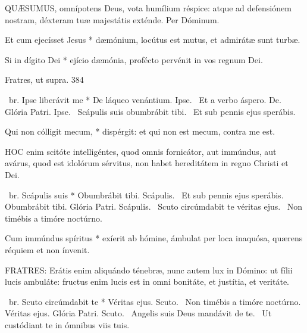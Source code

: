 
\lettrine[lines=2]{Q}{UÆSUMUS}, omnípotens Deus, vota humílium réspice: atque ad defensiónem nostram, déxteram tuæ majestátis exténde. Per Dóminum.


 Et cum ejecísset Jesus * dæmónium, locútus est mutus, et admirátæ sunt turbæ.


 Si in dígito Dei * ejício dæmónia, profécto pervénit in vos regnum Dei.

 Fratres, ut supra. 384

\R\ br. Ipse liberávit me * De láqueo venántium. Ipse. \V\ Et a verbo áspero. De. Glória Patri. Ipse. \V\ Scápulis suis obumbrábit tibi. \R\ Et sub pennis ejus sperábis.


 Qui non cólligit mecum, * dispérgit: et qui non est mecum, contra me est.


\lettrine[lines=2]{H}{OC} enim scitóte intelligéntes, quod omnis fornicátor, aut immúndus, aut avárus, quod est idolórum sérvitus, non habet hereditátem in regno Christi et Dei.

\R\ br. Scápulis suis * Obumbrábit tibi. Scápulis. \V\ Et sub pennis ejus sperábis. Obumbrábit tibi. Glória Patri. Scápulis. \V\ Scuto circúmdabit te véritas ejus. \R\ Non timébis a timóre noctúrno.


 Cum immúndus spíritus * exíerit ab hómine, ámbulat per loca inaquósa, quærens réquiem et non ínvenit.


\lettrine[lines=2]{F}{RATRES}: Erátis enim aliquándo ténebræ, nunc autem lux in Dómino: ut fílii lucis ambuláte: fructus enim lucis est in omni bonitáte, et justítia, et veritáte.

\R\ br. Scuto circúmdabit te * Véritas ejus. Scuto. \V\ Non timébis a timóre noctúrno. Véritas ejus. Glória Patri. Scuto. \V\ Angelis suis Deus mandávit de te. \R\ Ut custódiant te in ómnibus viis tuis.



